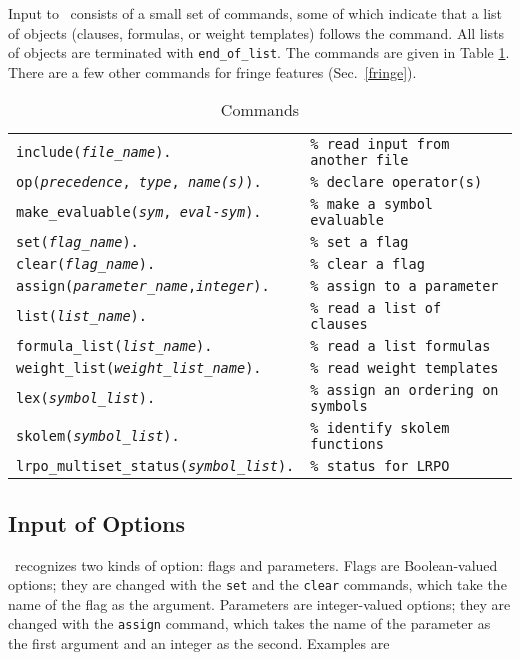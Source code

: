 \documentclass[11pt]{article}
\begin{document}
Input to \otter\ consists of a small set of commands, some of
which indicate that a list of objects (clauses, formulas, or weight
templates) follows the command.  All lists of objects are terminated
with \verb:end_of_list:.  The commands are given in Table \ref{command-tab}.
There are a few other commands for fringe features (Sec.~\ref{fringe}).
\begin{table}[ht] \centering \small
\caption{Commands}  \label{command-tab}
\begin{tabular}{ll}
\hline
{\tt include({\it file\_name}).}   & \verb:% read input from another file:  \\
{\tt op({\it precedence}, {\it type}, {\it name(s)}).} & \verb:% declare operator(s):  \\
{\tt make\_evaluable({\it sym}, {\it eval-sym}).} & \verb:% make a symbol evaluable:  \\
{\tt set({\it flag\_name}).}           & \verb:% set a flag: \\
{\tt clear({\it flag\_name}).}         & \verb:% clear a flag: \\
{\tt assign({\it parameter\_name},{\it integer}).} & \verb:% assign to a parameter: \\
{\tt list({\it list\_name}).}          & \verb:% read a list of clauses: \\
{\tt formula\_list({\it list\_name}).} & \verb:% read a list formulas: \\
{\tt weight\_list({\it weight\_list\_name}).}  & \verb:% read weight templates: \\
{\tt lex({\it symbol\_list}).}         & \verb:% assign an ordering on symbols: \\
{\tt skolem({\it symbol\_list}).}      & \verb:% identify skolem functions: \\
{\tt lrpo\_multiset\_status({\it symbol\_list}).} & \verb:% status for LRPO: \\
\hline
\end{tabular}
\end{table}
\noindent

\subsection{Input of Options} \label{input-options}

\otter\ recognizes two kinds of option: flags and parameters.
Flags are Boolean-valued options; they are changed with the
\verb:set: and the \verb:clear: commands, which take the name of the flag as
the argument.
Parameters are integer-valued options; they are changed with the
\verb:assign: command, which takes the name of the parameter as the
first argument and an integer as the second.  Examples are
\end{document}
